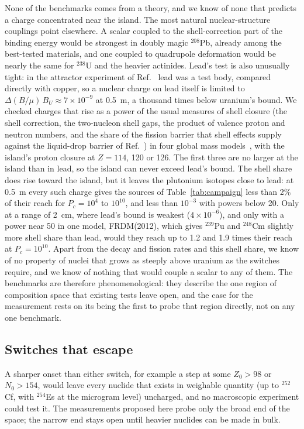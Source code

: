 \documentclass[aps,prd,onecolumn,superscriptaddress,floatfix,nofootinbib]{revtex4-2}
\newcommand{\Pu}[1]{$^{#1}$Pu}
\newcommand{\nuc}[2]{$^{#1}$#2}
\begin{document}
None of the benchmarks comes from a theory, and we know of none that predicts a charge concentrated near the island.
The most natural nuclear-structure couplings point elsewhere. A scalar coupled to the shell-correction part of the
binding energy would be strongest in doubly magic \nuc{208}{Pb}, already among the best-tested materials, and one
coupled to quadrupole deformation would be nearly the same for \nuc{238}{U} and the heavier actinides. Lead's test is
also unusually tight: in the attractor experiment of Ref.~\cite{Smith2000} lead was a test body, compared directly
with copper, so a nuclear charge on lead itself is limited to $\Delta(B/\mu)\,B_U\approx7\times10^{-9}$ at 0.5~m, a
thousand times below uranium's bound. We checked charges that rise as a power of the usual measures of shell closure
(the shell correction, the two-nucleon shell gaps, the product of valence proton and neutron numbers, and the share
of the fission barrier that shell effects supply against the liquid-drop barrier of Ref.~\cite{Myers1966}) in four
global mass models~\cite{Ma2019,Wang2014,Moller2016,Koura2005}, with the island's proton closure at $Z=114$, 120 or
126. The first three are no larger at the island than in lead, so the island can never exceed lead's bound. The
shell share does rise toward the island, but it leaves the plutonium isotopes close to lead: at 0.5~m every such
charge gives the sources of Table~\ref{tab:campaign} less than 2\% of their reach for $P_c=10^{4}$ to $10^{10}$, and
less than $10^{-3}$ with powers below 20. Only at a range of 2~cm, where lead's bound is weakest ($4\times10^{-6}$),
and only with a power near 50 in one model, FRDM(2012), which gives \Pu{239} and \nuc{248}{Cm} slightly more shell
share than lead, would they reach up to 1.2 and 1.9 times their reach at $P_c=10^{10}$. Apart from the
decay and fission rates and this shell share, we know of no property of nuclei that grows as steeply above uranium
as the switches require, and we know of nothing that would couple a scalar to any of them. The benchmarks are therefore phenomenological: they describe
the one region of composition space that existing tests leave open, and the case for the measurement rests on its
being the first to probe that region directly, not on any one benchmark.

\subsection{Switches that escape}

A sharper onset than either switch, for example a step at some $Z_0>98$ or $N_0>154$, would leave every nuclide
that exists in weighable quantity (up to \nuc{252}{Cf}, with \nuc{254}{Es} at the microgram level) uncharged, and
no macroscopic experiment could test it. The measurements proposed here probe only the broad end of the space; the
narrow end stays open until heavier nuclides can be made in bulk.
\end{document}
